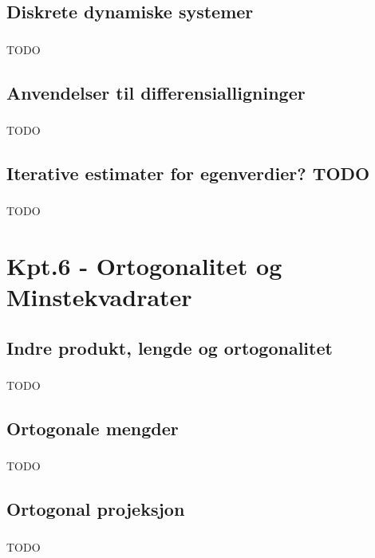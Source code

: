 \documentclass{article}
\begin{document}
    \subsection{Diskrete dynamiske systemer}
      \subsubsection{}
        TODO
    \subsection{Anvendelser til differensialligninger}
      \subsubsection{}
        TODO
    \subsection{Iterative estimater for egenverdier? TODO}
      \subsubsection{}
        TODO
  \section{Kpt.6 - Ortogonalitet og Minstekvadrater}
    \subsection{Indre produkt, lengde og ortogonalitet}
      \subsubsection{}
        TODO
    \subsection{Ortogonale mengder}
      \subsubsection{}
        TODO
    \subsection{Ortogonal projeksjon}
      \subsubsection{}
        TODO
\end{document}
